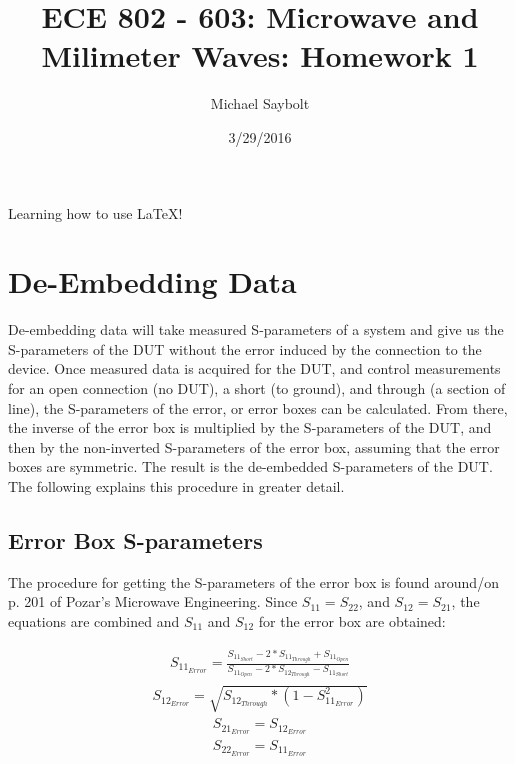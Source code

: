 \documentclass{article} %
\begin{document}
	\author{Michael Saybolt}
	\title{ECE 802 - 603: Microwave and Milimeter Waves: Homework 1}
	\date{3/29/2016} %
	\maketitle
	
	Learning how to use \LaTeX{}!
	
	\newpage{} %
	
	\tableofcontents{} %
	
	\section{De-Embedding Data}
	De-embedding data will take measured S-parameters of a system and give us the S-parameters of the DUT without the error induced by the connection to the device.  Once measured data is acquired for the DUT, and control measurements for an open connection (no DUT), a short (to ground), and through (a section of line), the S-parameters of the error, or error boxes can be calculated.  From there, the inverse of the error box is multiplied by the S-parameters of the DUT, and then by the non-inverted S-parameters of the error box, assuming that the error boxes are symmetric.  The result is the de-embedded S-parameters of the DUT.  The following explains this procedure in greater detail.
	
	\subsection{Error Box S-parameters} \label{ssec:errorBox}
	The procedure for getting the S-parameters of the error box is found around/on p. 201 of Pozar's Microwave Engineering. Since $S_{11} = S_{22}$, and $S_{12} = S_{21}$, the equations are combined and $S_{11}$ and $S_{12}$ for the error box are obtained:
	
	\begin{align}
	S_{11_{Error}} = \frac{S_{11_{Short}} - 2*S_{11_{Through}} + S_{11_{Open}}}{S_{11_{Open}} - 2*S_{12_{Through}} - S_{11_{Short}}}
	\end{align}
	\begin{align}
	S_{12_{Error}} = \sqrt{S_{12_{Through}} * (1-S_{11_{Error}}^2)}
	\end{align}
	\begin{align}
	S_{21_{Error}} = S_{12_{Error}}
	\end{align}
	\begin{align}
	S_{22_{Error}} = S_{11_{Error}}
	\end{align}
\end{document}
